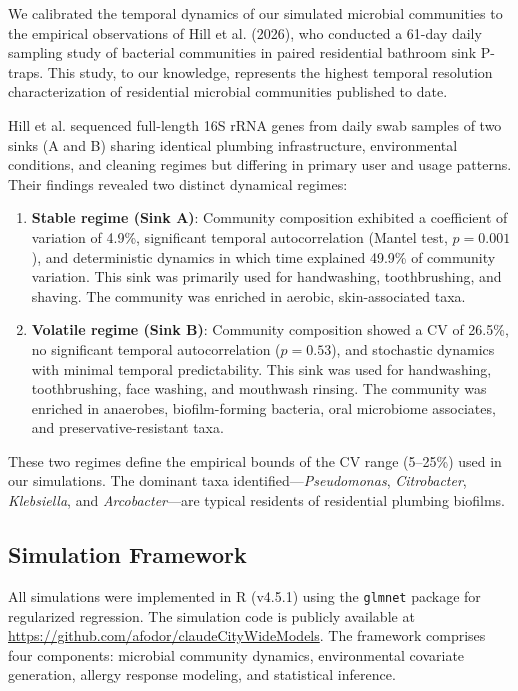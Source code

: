 \documentclass[11pt,letterpaper]{article}
\begin{document}
We calibrated the temporal dynamics of our simulated microbial communities to the empirical observations of Hill et al. (2026), who conducted a 61-day daily sampling study of bacterial communities in paired residential bathroom sink P-traps. This study, to our knowledge, represents the highest temporal resolution characterization of residential microbial communities published to date.

Hill et al. sequenced full-length 16S rRNA genes from daily swab samples of two sinks (A and B) sharing identical plumbing infrastructure, environmental conditions, and cleaning regimes but differing in primary user and usage patterns. Their findings revealed two distinct dynamical regimes:

\begin{enumerate}
    \item \textbf{Stable regime (Sink A)}: Community composition exhibited a coefficient of variation of 4.9\%, significant temporal autocorrelation (Mantel test, $p = 0.001$), and deterministic dynamics in which time explained 49.9\% of community variation. This sink was primarily used for handwashing, toothbrushing, and shaving. The community was enriched in aerobic, skin-associated taxa.

    \item \textbf{Volatile regime (Sink B)}: Community composition showed a CV of 26.5\%, no significant temporal autocorrelation ($p = 0.53$), and stochastic dynamics with minimal temporal predictability. This sink was used for handwashing, toothbrushing, face washing, and mouthwash rinsing. The community was enriched in anaerobes, biofilm-forming bacteria, oral microbiome associates, and preservative-resistant taxa.
\end{enumerate}

These two regimes define the empirical bounds of the CV range (5--25\%) used in our simulations. The dominant taxa identified---\textit{Pseudomonas}, \textit{Citrobacter}, \textit{Klebsiella}, and \textit{Arcobacter}---are typical residents of residential plumbing biofilms.

\subsection{Simulation Framework}

All simulations were implemented in R (v4.5.1) using the \texttt{glmnet} package for regularized regression. The simulation code is publicly available at \url{https://github.com/afodor/claudeCityWideModels}. The framework comprises four components: microbial community dynamics, environmental covariate generation, allergy response modeling, and statistical inference.
\end{document}

